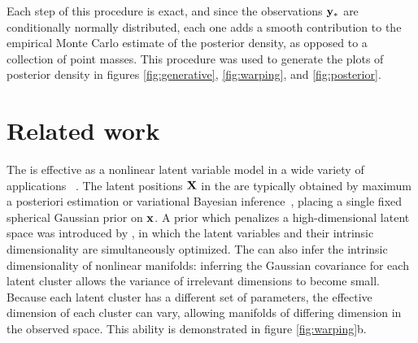 Each step of this procedure is exact, and since the observations ${\bf{y}}_{*}$ are conditionally normally distributed, each one adds a smooth contribution to the empirical Monte Carlo estimate of the posterior density, as opposed to a collection of point masses.  This procedure was used to generate the plots of posterior density in figures \ref{fig:generative}, \ref{fig:warping}, and \ref{fig:posterior}.

\section{Related work}

The \gplvm{} is effective as a nonlinear latent variable model in a wide variety of applications ~\citep{lawrence2004gaussian,salzmann2008local,lawrence2009non}.
The latent positions $\mathbf{X}$ in the \gplvm{} are typically obtained by maximum a posteriori estimation or variational Bayesian inference~\citep{titsias2010bayesian}, placing a single fixed spherical Gaussian prior on ${\bf{x}}$.
A prior which penalizes a high-dimensional latent space was introduced by \citet{geiger2009rank}, in which the latent variables and their intrinsic dimensionality are simultaneously optimized.
The \iwmm{} can also infer the intrinsic dimensionality of nonlinear manifolds:
inferring the Gaussian covariance for each latent cluster allows the variance of irrelevant dimensions to become small.  
Because each latent cluster has a different set of parameters, the effective dimension of each cluster can vary, allowing manifolds of differing dimension in the observed space.
This ability is demonstrated in figure \ref{fig:warping}b.

